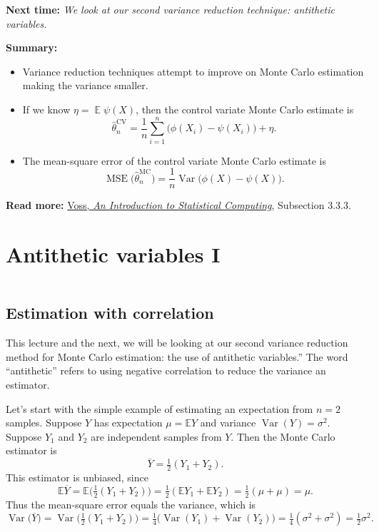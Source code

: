 \documentclass[
  letterpaper,
  DIV=11,
  numbers=noendperiod]{scrreprt}
\newcommand{\Exg}{\operatorname{\mathbb{E}}}
\newcommand{\Ex}{\mathbb{E}}
\newcommand{\Var}{\operatorname{Var}}
\theoremstyle{plain}
\theoremstyle{definition}
\theoremstyle{definition}
\theoremstyle{remark}
\begin{document}
\textbf{Next time:} \emph{We look at our second variance reduction
technique: antithetic variables.}

\textbf{Summary:}

\begin{itemize}
\item
  Variance reduction techniques attempt to improve on Monte Carlo
  estimation making the variance smaller.
\item
  If we know \(\eta = \Exg \psi(X)\), then the control variate Monte
  Carlo estimate is
  \[ \widehat{\theta}_n^{\mathrm{CV}} = \frac{1}{n} \sum_{i=1}^n \big(\phi(X_i) - \psi(X_i)\big) + \eta.\]
\item
  The mean-square error of the control variate Monte Carlo estimate is
  \[{\displaystyle \operatorname{MSE}\big(\widehat{\theta}_n^{\mathrm{MC}}\big) = \frac{1}{n} \operatorname{Var}\big(\phi(X) - \psi(X)\big)}.\]
\end{itemize}

\textbf{Read more:}
\href{https://leeds.primo.exlibrisgroup.com/permalink/44LEE_INST/1fj430b/cdi_askewsholts_vlebooks_9781118728031}{Voss,
\emph{An Introduction to Statistical Computing}}, Subsection 3.3.3.

\chapter{Antithetic variables I}\label{antithetic-variables-i}

\[ \]

\section{Estimation with correlation}\label{estimation-with-correlation}

This lecture and the next, we will be looking at our second variance
reduction method for Monte Carlo estimation: the use of antithetic
variables.'' The word ``antithetic'' refers to using negative
correlation to reduce the variance an estimator.

Let's start with the simple example of estimating an expectation from
\(n = 2\) samples. Suppose \(Y\) has expectation \(\mu = \Ex Y\) and
variance \(\Var(Y) = \sigma^2\). Suppose \(Y_1\) and \(Y_2\) are
independent samples from \(Y\). Then the Monte Carlo estimator is
\[ \overline Y = \tfrac12(Y_1 + Y_2) . \] This estimator is unbiased,
since
\[ \Ex \overline Y = \Ex \big(\tfrac12(Y_1 + Y_2)\big) = \tfrac12 ( \Ex Y_1 + \Ex Y_2 ) = \tfrac12 (\mu + \mu) = \mu . \]
Thus the mean-square error equals the variance, which is
\[ \Var \big( \overline Y\big) = \Var \big(\tfrac12(Y_1 + Y_2)\big) =\tfrac14 \big( \Var(Y_1) + \Var(Y_2) \big)= \tfrac14 (\sigma^2 + \sigma^2) = \tfrac12 \sigma^2 . \]
\end{document}
